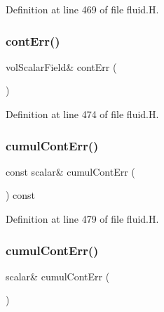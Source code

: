 Definition at line 469 of file fluid.\+H.

\mbox{\label{classFoam_1_1fluid_a5b893ff94e875bc29883c8a54ecc4071}} 
\subsubsection{\texorpdfstring{cont\+Err()}{contErr()}\hspace{0.1cm}{\footnotesize\ttfamily [2/2]}}
{\footnotesize\ttfamily vol\+Scalar\+Field\& cont\+Err (\begin{DoxyParamCaption}{ }\end{DoxyParamCaption})\hspace{0.3cm}{\ttfamily [inline]}}



Definition at line 474 of file fluid.\+H.

\mbox{\label{classFoam_1_1fluid_a9b122adb82391a8280974471be0952f2}} 
\subsubsection{\texorpdfstring{cumul\+Cont\+Err()}{cumulContErr()}\hspace{0.1cm}{\footnotesize\ttfamily [1/2]}}
{\footnotesize\ttfamily const scalar\& cumul\+Cont\+Err (\begin{DoxyParamCaption}{ }\end{DoxyParamCaption}) const\hspace{0.3cm}{\ttfamily [inline]}}



Definition at line 479 of file fluid.\+H.

\mbox{\label{classFoam_1_1fluid_a8d0ed49195bd433f3dfecf83e43beccf}} 
\subsubsection{\texorpdfstring{cumul\+Cont\+Err()}{cumulContErr()}\hspace{0.1cm}{\footnotesize\ttfamily [2/2]}}
{\footnotesize\ttfamily scalar\& cumul\+Cont\+Err (\begin{DoxyParamCaption}{ }\end{DoxyParamCaption})\hspace{0.3cm}{\ttfamily [inline]}}



